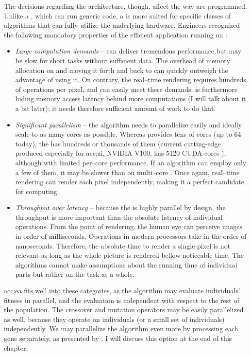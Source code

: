 The decisions regarding the architecture, though, affect the way  are programmed. Unlike a \cpuns, which can run generic code, a \gpu is more suited for specific classes of algorithms that can fully utilize the underlying hardware. Engineers recognized the following mandatory properties of the efficient application running on \gpu \citep{GPUComputingOwens}:
\begin{itemize}
    \item \textit{Large computation demands} -- \gpu can deliver tremendous performance but may be slow for short tasks without sufficient data. The overhead of memory allocation on \gpu and moving it forth and back to \cpu can quickly outweigh the advantage of using it. On contrary, the real--time rendering requires hundreds of operations per pixel, and \gpu can easily meet these demands. \gpu is furthermore hiding memory access latency behind more computations (I will talk about it a bit later); it needs therefore sufficient amount of work to do that.
    \item \textit{Significant parallelism} -- the algorithm needs to parallelize easily and ideally scale to as many cores as possible. Whereas \cpu provides tens of cores (up to 64 today), the \gpu has hundreds or thousands of them (current cutting-edge \gpu produced especially for \acrshort{acc:ai}, NVIDIA V100, has 5120 CUDA cores \citep{nvidiav100spec}), although with limited per--core performance. If an algorithm can employ only a few of them, it may be slower than on multi--core \cpuns. Once again, real--time rendering can render each pixel independently, making it a perfect candidate for \gpu computing.
    \item \textit{Throughput over latency} -- because the \gpu is highly parallel by design, the throughput is more important than the absolute latency of individual operations. From the point of rendering, the human eye can perceive images in order of milliseconds. Operations in modern processors take in the order of nanoseconds. Therefore, the absolute time to render a single pixel is not relevant as long as the whole picture is rendered bellow noticeable time. The algorithms cannot make assumptions about the running time of individual parts but rather on the task as a whole.
\end{itemize}

\acrlong{acc:ea} fits well into these categories, as the algorithm may evaluate individuals' fitness in parallel, and the evaluation is independent with respect to the rest of the population. The crossover and mutation operators may be easily parallelized as well, because they operate on individuals (or a small set of individuals) independently. We may parallelize the algorithm even more by processing each gene separately, as presented by \citet{CHENG2019514}. I will discuss this option at the end of this chapter.




